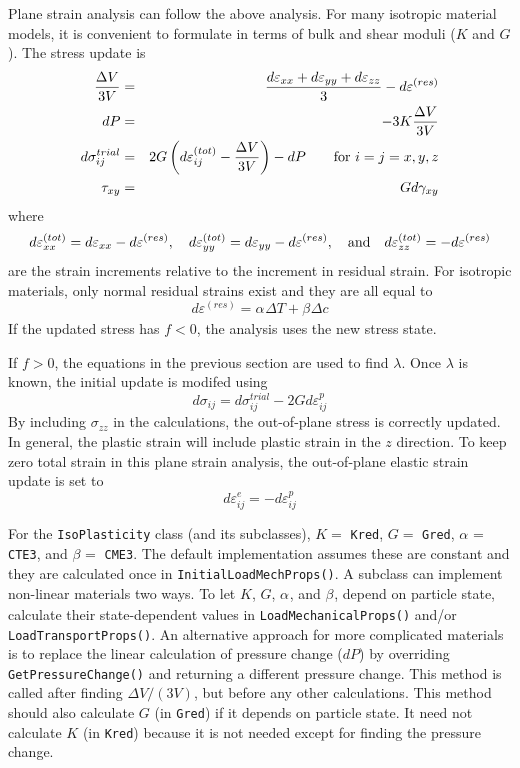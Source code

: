 \documentclass[11pt]{article}
\def\a#1{\alpha_{#1}}
\def\b#1{\beta_{#1}}
\def\code#1{{\small\tt #1}}
\def\DT{\Delta T}
\def\er#1{\varepsilon_{#1}^{(res)}}
\def\s#1{\sigma_{#1}}
\begin{document}
Plane strain analysis can follow the above analysis. For many isotropic material models, it is convenient to formulate in terms of bulk and shear moduli ($K$ and $G$). The stress update is
\begin{eqnarray}
       {\Delta V\over 3V} & = & {d\varepsilon_{xx} + d\varepsilon_{yy} + d\varepsilon_{zz} \over 3} - d\er{} \\
       dP & = & -3K {\Delta V\over 3V} \\
       d\s{ij}^{trial} & = & 2G \left(d\varepsilon_{ij}^{(tot)} - {\Delta V\over 3V}\right) - dP  \qquad {\rm for\ }i=j=x,y,z\\
       \tau_{xy} & = & G d\gamma_{xy} \\
\end{eqnarray}
where
\begin{equation}
      d\varepsilon_{xx}^{(tot)} = d\varepsilon_{xx} - d\er{}, \quad
      d\varepsilon_{yy}^{(tot)} = d\varepsilon_{yy} - d\er{}, \quad {\rm and}\quad
      d\varepsilon_{zz}^{(tot)} =  - d\er{}
\end{equation}
are the strain increments relative to the increment in residual strain. For isotropic materials, only normal residual strains exist and they are all equal to
\begin{equation}
      d\er{} = \a{}\DT + \b{}\Delta c
\end{equation}
If the updated stress has $f<0$, the analysis uses the new stress state.

If $f>0$, the equations in the previous section are used to find $\lambda$. Once $\lambda$ is known, the initial update is modifed using
\begin{equation}
     d\s{ij} = d\s{ij}^{trial} - 2G d\varepsilon_{ij}^{p} 
\end{equation}
By including $\s{zz}$ in the calculations, the out-of-plane stress is correctly updated. In general, the plastic strain will include plastic strain in the $z$ direction. To keep zero total strain in this plane strain analysis, the out-of-plane elastic strain update is set to
\begin{equation}
       d\varepsilon_{ij}^{e} = -d\varepsilon_{ij}^{p}  
\end{equation}

For the \code{IsoPlasticity} class (and its subclasses), $K=$ \code{Kred}, $G=$ \code{Gred}, $\a{}=$ \code{CTE3}, and $\b{}=$ \code{CME3}. The default implementation assumes these are constant and they are calculated once in \code{InitialLoadMechProps()}. A subclass can implement non-linear materials two ways. To let $K$, $G$, $\a{}$, and $\b{}$, depend on particle state, calculate their state-dependent values in \code{LoadMechanicalProps()} and/or \code{LoadTransportProps()}. An alternative approach for more complicated materials is to replace the linear calculation of pressure change ($dP$) by overriding \code{GetPressureChange()} and returning a different pressure change. This method is called after finding ${\Delta V/(3V)}$, but before any other calculations. This method should also calculate $G$ (in \code{Gred}) if it depends on particle state. It need not calculate $K$ (in \code{Kred}) because it is not needed except for finding the pressure change.
\end{document}
